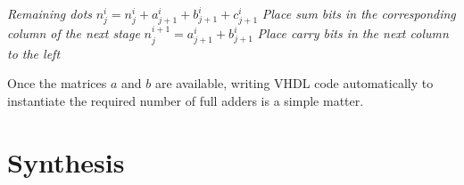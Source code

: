 \begin{algorithmic}
		\ELSE
		\ENDIF
		 \textit{ Remaining dots}
		\STATE $n_j^i = n_j^i + a_{j+1}^i + b_{j+1}^i + c_{j+1}^i$ \textit{Place sum bits in the corresponding column of the next stage}
		\STATE $n_j^{i+1} = a_{j+1}^i + b_{j+1}^i$ \textit{Place carry bits in the next column to the left}
		\ENDFOR
	\ENDFOR
\end{algorithmic}

Once the matrices $a$ and $b$ are available, writing VHDL code automatically to instantiate the required number of full adders is a simple matter.

\section{Synthesis}

